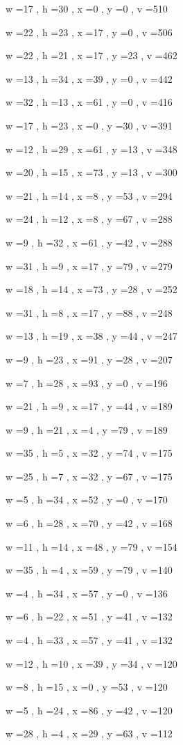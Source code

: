 \documentclass[11pt]{article}
\begin{document}
w =17 , h =30 , x =0 , y =0 , v =510
\par
w =22 , h =23 , x =17 , y =0 , v =506
\par
w =22 , h =21 , x =17 , y =23 , v =462
\par
w =13 , h =34 , x =39 , y =0 , v =442
\par
w =32 , h =13 , x =61 , y =0 , v =416
\par
w =17 , h =23 , x =0 , y =30 , v =391
\par
w =12 , h =29 , x =61 , y =13 , v =348
\par
w =20 , h =15 , x =73 , y =13 , v =300
\par
w =21 , h =14 , x =8 , y =53 , v =294
\par
w =24 , h =12 , x =8 , y =67 , v =288
\par
w =9 , h =32 , x =61 , y =42 , v =288
\par
w =31 , h =9 , x =17 , y =79 , v =279
\par
w =18 , h =14 , x =73 , y =28 , v =252
\par
w =31 , h =8 , x =17 , y =88 , v =248
\par
w =13 , h =19 , x =38 , y =44 , v =247
\par
w =9 , h =23 , x =91 , y =28 , v =207
\par
w =7 , h =28 , x =93 , y =0 , v =196
\par
w =21 , h =9 , x =17 , y =44 , v =189
\par
w =9 , h =21 , x =4 , y =79 , v =189
\par
w =35 , h =5 , x =32 , y =74 , v =175
\par
w =25 , h =7 , x =32 , y =67 , v =175
\par
w =5 , h =34 , x =52 , y =0 , v =170
\par
w =6 , h =28 , x =70 , y =42 , v =168
\par
w =11 , h =14 , x =48 , y =79 , v =154
\par
w =35 , h =4 , x =59 , y =79 , v =140
\par
w =4 , h =34 , x =57 , y =0 , v =136
\par
w =6 , h =22 , x =51 , y =41 , v =132
\par
w =4 , h =33 , x =57 , y =41 , v =132
\par
w =12 , h =10 , x =39 , y =34 , v =120
\par
w =8 , h =15 , x =0 , y =53 , v =120
\par
w =5 , h =24 , x =86 , y =42 , v =120
\par
w =28 , h =4 , x =29 , y =63 , v =112
\end{document}
